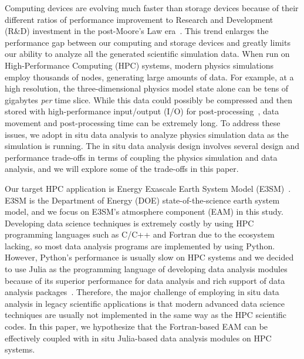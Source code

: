 \documentclass{juliacon}
\begin{document}
Computing devices are evolving much faster than storage devices because of their different ratios of performance improvement to Research and Development (R\&D) investment in the post-Moore’s Law era~\cite{thompson2018decline}. This trend enlarges the performance gap between our computing and storage devices and greatly limits our ability to analyze all the generated scientific simulation data. When run on High-Performance Computing (HPC) systems, modern physics simulations employ thousands of nodes, generating large amounts of data. For example, at a high resolution, the three-dimensional physics model state alone can be tens of gigabytes \emph{per} time slice. While this data could possibly be compressed and then stored with high-performance input/output (I/O) for post-processing~\cite{jin2022accelerating,scorpio}, data movement and post-processing time can be extremely long. To address these issues, we adopt in situ data analysis to analyze physics simulation data as the simulation is running. The in situ data analysis design involves several design and performance trade-offs in terms of coupling the physics simulation and data analysis, and we will explore some of the trade-offs in this paper.



Our target HPC application is Energy Exascale Earth System Model (E3SM)~\cite{golaz2019doe}. E3SM is the Department of Energy (DOE) state-of-the-science earth system model, and we focus on E3SM's atmosphere component (EAM) in this study. Developing data science techniques is extremely costly by using HPC programming languages such as C/C++ and Fortran due to the ecosystem lacking, so most data analysis programs are implemented by using Python. However, Python's performance is usually slow on HPC systems and we decided to use Julia as the programming language of developing data analysis modules because of its superior performance for data analysis and rich support of data analysis packages~\cite{hunold2020benchmarking}. Therefore, the major challenge of employing in situ data analysis in legacy scientific applications is that modern advanced data science techniques are usually not implemented in the same way as the HPC scientific codes. In this paper, we hypothesize that the Fortran-based EAM can be effectively coupled with in situ Julia-based data analysis modules on HPC systems.
\end{document}
